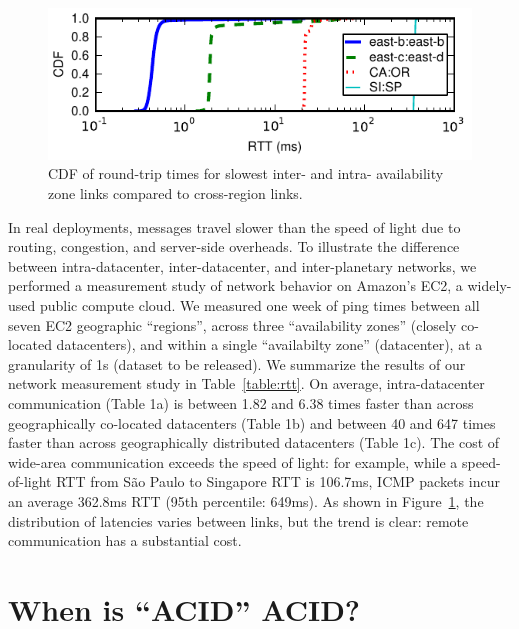 \begin{figure}
\includegraphics[width=\columnwidth]{figs/ping-plot.pdf}\vspace{-1em}
\caption{CDF of round-trip times for slowest inter- and intra-
  availability zone links compared to cross-region links.}\vspace{-1em}
\label{fig:rtt}
\end{figure}

In real deployments, messages travel slower than the speed of light
due to routing, congestion, and server-side overheads. To illustrate
the difference between intra-datacenter, inter-datacenter, and
inter-planetary networks, we performed a measurement study of network
behavior on Amazon's EC2, a widely-used public compute cloud. We
measured one week of ping times between all seven EC2 geographic
``regions'', across three ``availability zones'' (closely co-located
datacenters), and within a single ``availabilty zone'' (datacenter),
at a granularity of 1s (dataset to be released). We summarize the
results of our network measurement study in Table~\ref{table:rtt}. On
average, intra-datacenter communication (Table 1a) is between 1.82 and
6.38 times faster than across geographically co-located datacenters
(Table 1b) and between 40 and 647 times faster than across
geographically distributed datacenters (Table 1c). The cost of
wide-area communication exceeds the speed of light: for example, while
a speed-of-light RTT from S\~{a}o Paulo to Singapore RTT is 106.7ms,
ICMP packets incur an average 362.8ms RTT (95th percentile: 649ms). As
shown in Figure~\ref{fig:rtt}, the distribution of latencies varies
between links, but the trend is clear: remote communication has a
substantial cost.

\section{When is ``ACID'' ACID?}
\label{sec:modernacid}

